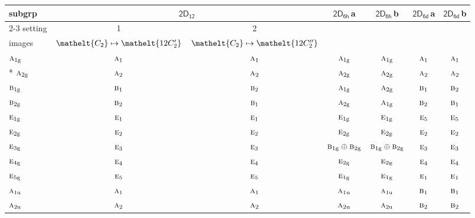 \documentclass[10pt,a4paper]{article}
\numberwithin{equation}{section}
\newcommand{\eltfont}[1]{{\let\sigma\eltsigma\mathelt{#1}}}
\newcommand{\grp}[1]{\mathsf{#1}}
\newcommand{\irr}[1]{\text{\normalfont\scshape #1}}
\newcommand{\cls}[1]{\eltfont{#1}}
\newcommand{\ptag}[1]{\mathrm{#1}}
\newcommand{\clsletter}[1]{\,{\scriptsize\color{black!55}#1}}
\begin{document}
{\small\begin{longtable}{@{}lcccccc@{}}\toprule
subgrp & \multicolumn{2}{c}{\href{2D12.pdf}{$\grp{2D_{12}}$}} & \href{2D6h.pdf}{$\grp{2D_{6h}}$}\clsletter{a} & \href{2D6h.pdf}{$\grp{2D_{6h}}$}\clsletter{b} & \href{2D6d.pdf}{$\grp{2D_{6d}}$}\clsletter{a} & \href{2D6d.pdf}{$\grp{2D_{6d}}$}\clsletter{b}\\\cmidrule(lr){2-3}
setting & 1 & 2 &  &  &  & \\
images & {\scriptsize $\cls{C_{2}} \mapsto \cls{12C_{2}'}$} & {\scriptsize $\cls{C_{2}} \mapsto \cls{12C_{2}''}$} &  &  &  & \\\midrule\endhead
\bottomrule\endfoot\endlastfoot
$\irr{a}_{1\ptag{g}}$ & $\irr{a}_{1}$ & $\irr{a}_{1}$ & $\irr{a}_{1\ptag{g}}$ & $\irr{a}_{1\ptag{g}}$ & $\irr{a}_{1}$ & $\irr{a}_{1}$\\*
$\irr{a}_{2\ptag{g}}$ & $\irr{a}_{2}$ & $\irr{a}_{2}$ & $\irr{a}_{2\ptag{g}}$ & $\irr{a}_{2\ptag{g}}$ & $\irr{a}_{2}$ & $\irr{a}_{2}$\\
$\irr{b}_{1\ptag{g}}$ & $\irr{b}_{1}$ & $\irr{b}_{2}$ & $\irr{a}_{1\ptag{g}}$ & $\irr{a}_{2\ptag{g}}$ & $\irr{b}_{1}$ & $\irr{b}_{2}$\\
$\irr{b}_{2\ptag{g}}$ & $\irr{b}_{2}$ & $\irr{b}_{1}$ & $\irr{a}_{2\ptag{g}}$ & $\irr{a}_{1\ptag{g}}$ & $\irr{b}_{2}$ & $\irr{b}_{1}$\\
$\irr{e}_{1\ptag{g}}$ & $\irr{e}_{1}$ & $\irr{e}_{1}$ & $\irr{e}_{1\ptag{g}}$ & $\irr{e}_{1\ptag{g}}$ & $\irr{e}_{5}$ & $\irr{e}_{5}$\\
$\irr{e}_{2\ptag{g}}$ & $\irr{e}_{2}$ & $\irr{e}_{2}$ & $\irr{e}_{2\ptag{g}}$ & $\irr{e}_{2\ptag{g}}$ & $\irr{e}_{2}$ & $\irr{e}_{2}$\\
$\irr{e}_{3\ptag{g}}$ & $\irr{e}_{3}$ & $\irr{e}_{3}$ & $\irr{b}_{1\ptag{g}}\oplus \irr{b}_{2\ptag{g}}$ & $\irr{b}_{1\ptag{g}}\oplus \irr{b}_{2\ptag{g}}$ & $\irr{e}_{3}$ & $\irr{e}_{3}$\\
$\irr{e}_{4\ptag{g}}$ & $\irr{e}_{4}$ & $\irr{e}_{4}$ & $\irr{e}_{2\ptag{g}}$ & $\irr{e}_{2\ptag{g}}$ & $\irr{e}_{4}$ & $\irr{e}_{4}$\\
$\irr{e}_{5\ptag{g}}$ & $\irr{e}_{5}$ & $\irr{e}_{5}$ & $\irr{e}_{1\ptag{g}}$ & $\irr{e}_{1\ptag{g}}$ & $\irr{e}_{1}$ & $\irr{e}_{1}$\\
$\irr{a}_{1\ptag{u}}$ & $\irr{a}_{1}$ & $\irr{a}_{1}$ & $\irr{a}_{1\ptag{u}}$ & $\irr{a}_{1\ptag{u}}$ & $\irr{b}_{1}$ & $\irr{b}_{1}$\\
$\irr{a}_{2\ptag{u}}$ & $\irr{a}_{2}$ & $\irr{a}_{2}$ & $\irr{a}_{2\ptag{u}}$ & $\irr{a}_{2\ptag{u}}$ & $\irr{b}_{2}$ & $\irr{b}_{2}$\\

\end{longtable}}
\end{document}
